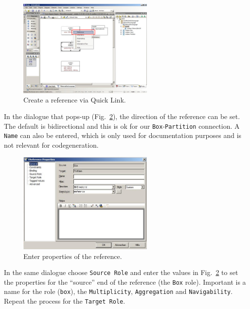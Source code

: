 \begin{figure}[htbp]
	\centering
  \includegraphics[width=0.6\textwidth]{pics/memBox24.png}
	\caption{Create a reference via Quick Link.}
	\label{fig:ereference}
\end{figure}

In the dialogue that pops-up (Fig.~\ref{fig:ereference_properties}), the
direction of the reference can be set.  The default is bidirectional and this is
ok for our \texttt{Box}-\texttt{Partition} connection.  A \texttt{Name} can also
be entered, which is only used for documentation purposes and is not relevant
for codegeneration.

\begin{figure}[htbp]
	\centering
  \includegraphics[width=0.6\textwidth]{pics/memBox25.png}
	\caption{Enter properties of the reference.}
	\label{fig:ereference_properties}
\end{figure}
	
\clearpage

In the same dialogue choose \texttt{Source Role} and enter the values in
Fig.~\ref{fig:ereference_properties} to set the properties for the ``source''
end of the reference (the \texttt{Box} role).  Important is a name for the role
(\texttt{box}), the \texttt{Multiplicity}, \texttt{Aggregation} and
\texttt{Navigability}.  Repeat the process for the \texttt{Target Role}.
  
